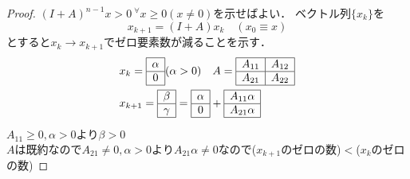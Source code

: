 \begin{proof}
${(I+A)}^{n-1}x>0\ {}^{\forall}x\geq 0(x\neq 0)$を示せばよい．
ベクトル列$\{x_k\}$を
\begin{equation}
x_{k+1}=(I+A)x_k\quad (x_0 \equiv x)    
\end{equation}
とすると$x_k \to x_{k+1}でゼロ要素数が減ることを示す．$
\begin{align}
  &x_k =
  \begin{array}{|c|}
     \hline
     \alpha\\\hline
     0\\\hline
  \end{array}(\alpha >0)\ \ \ A=
  \begin{array}{|c|c|}
    \hline
    A_{11} & A_{12}\\\hline
    A_{21} & A_{22}\\\hline
  \end{array}\\
  &x_{k+1}=
  \begin{array}{|c|}
     \hline
     \beta\\\hline
     \gamma\\\hline
  \end{array}=
    \begin{array}{|c|}
    \hline
    \alpha\\\hline
    0\\\hline
  \end{array}
  +
  \begin{array}{|c|}
    \hline
    A_{11} \alpha\\\hline
    A_{21} \alpha\\\hline
  \end{array}
\end{align}

$A_{11}\geq 0,\alpha >0より\beta >0$\\
$A$は既約なので$A_{21}\neq 0,\alpha >0よりA_{21}\alpha \neq 0$なので($x_{k+1}$のゼロの数)$<$($x_k$のゼロの数)
\end{proof}
